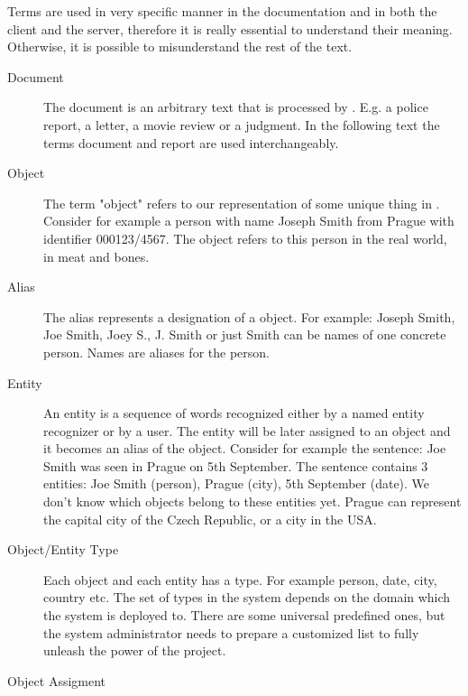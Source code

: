 Terms are used in very specific manner in the documentation and in both the
client and the server, therefore it is really essential to understand their
meaning. Otherwise, it is possible to misunderstand the rest of the text.

\begin{description}
\item[Document]
The document is an arbitrary text that is processed by \textan{}. E.g. a police
report, a letter, a movie review or a judgment. In the following text the terms
document and report are used interchangeably.

\item[Object]
The term "object" refers to our representation of some unique thing in
\textan{}. Consider for example a person with name Joseph Smith from Prague with
identifier 000123/4567. The object refers to this person in the real world, in
meat and bones.

\item[Alias]
The alias represents a designation of a object. For example: Joseph Smith, Joe
Smith, Joey S., J. Smith or just Smith can be names of one concrete person.
Names are aliases for the person.

\item[Entity]
An entity is a sequence of words recognized either by a named entity recognizer
or by a user. 
The entity will be later assigned to an object and it becomes an alias
of the object. Consider for example the sentence: Joe Smith was seen
in Prague on 5th September. The sentence contains 3 entities: Joe Smith (person),
Prague (city), 5th September (date). We don't know which objects belong to these
entities yet. Prague can represent the capital city of the Czech Republic,
or a city in the USA.

\item[Object/Entity Type]
Each object and each entity has a type. For example person, date, city, country
etc. The set of types in the system depends on the domain which the system is
deployed to. There are some universal predefined  ones, but the system
administrator needs to prepare a customized list to fully unleash the power of
the project. 

\item[Object Assigment]


\end{description}
